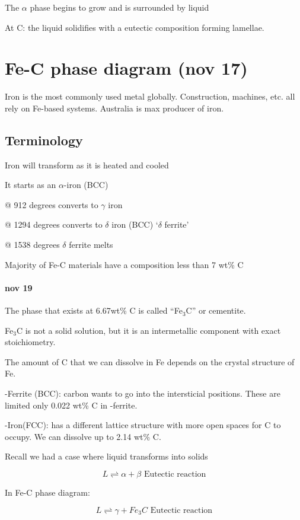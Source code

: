 \documentclass{article}
\begin{document}
The $\alpha$ phase begins to grow and is surrounded by liquid

At C: the liquid solidifies with a eutectic composition forming lamellae.

\section{Fe-C phase diagram (nov 17)}
Iron is the most commonly used metal globally. Construction, machines, etc. all rely on Fe-based systems. Australia is max producer of iron.

\subsection{Terminology}
Iron will transform as it is heated and cooled

It starts as an $\alpha$-iron (BCC)

@ 912 degrees converts to $\gamma$ iron

@ 1294 degrees converts to $\delta$ iron (BCC) `$\delta$ ferrite'

@ 1538 degrees $\delta$ ferrite melts

Majority of Fe-C materials have a composition less than 7 wt\% C

\paragraph{nov 19}

The phase that exists at 6.67wt\% C is called ``Fe$_3$C'' or cementite.

Fe$_3$C is not a solid solution, but it is an intermetallic component with exact stoichiometry.

The amount of C that we can dissolve in Fe depends on the crystal structure of Fe.

\textalpha-Ferrite (BCC): carbon wants to go into the intersticial positions. These are limited only 0.022 wt\% C in \textalpha-ferrite.

\textgamma-Iron(FCC): has a different lattice structure with more open spaces for C to occupy. We can dissolve up to 2.14 wt\% C.

Recall we had a case where liquid transforms into solids

\[L \rightleftharpoons \alpha + \beta \text{ Eutectic reaction}\] 

In Fe-C phase diagram:

\[L \rightleftharpoons \gamma + Fe_3C \text{ Eutectic reaction}\] 
\end{document}
